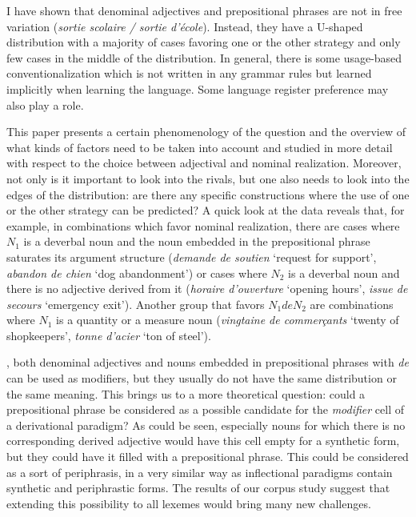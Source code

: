 \documentclass[output=paper]{LSP/langsci}
\begin{document}
I have shown that denominal adjectives and prepositional phrases are not in free variation (\emph{sortie scolaire / sortie d'école}). Instead, they have a U-shaped distribution with a majority of cases favoring one or the other strategy and only few cases in the middle of the distribution. In general, there is some usage-based conventionalization %
which is not written in any grammar rules but  learned  implicitly when learning the language. Some  language register preference may also play a role.%

This paper presents a certain phenomenology of the question and the overview of what kinds of factors need to be taken into account and studied in more detail with respect to the choice between adjectival and nominal realization. Moreover, not only is it important to look into the rivals, but one also needs to look into the edges of the distribution: are there any specific constructions where the use of one or the other strategy can be predicted? A quick look at the data reveals that, for example, in combinations which favor nominal realization, there are cases where $N_1$ is a deverbal noun and the noun embedded in the prepositional phrase saturates its argument structure (\emph{demande de soutien} `request for support', \emph{abandon de chien} `dog abandonment') or cases where $N_2$ is a deverbal noun and there is no adjective derived from it (\emph{horaire d'ouverture} `opening hours', \emph{issue de secours} `emergency exit'). Another group that favors $N_1deN_2$ are combinations where $N_1$ is a quantity or a measure noun (\emph{vingtaine de commerçants} `twenty of shopkeepers',  \emph{tonne d'acier } `ton of steel').

, both denominal adjectives and nouns embedded in prepositional phrases with \emph{de} can be used as modifiers, but they usually do not have the same distribution or the same meaning. This brings us to a more theoretical question: could a prepositional phrase be considered as a possible candidate for the \emph{modifier} cell of a derivational paradigm? As could be seen, especially nouns for which there is no corresponding derived adjective would have this cell empty for a synthetic form, but they could have it filled with a prepositional phrase. This could be considered as a sort of periphrasis, in a very similar way as inflectional paradigms contain synthetic and periphrastic forms. The results of our corpus study suggest that extending this possibility to all lexemes would bring many new challenges.


{\sloppy
    \printbibliography[heading=subbibliography,notkeyword=this]
}
\end{document}
